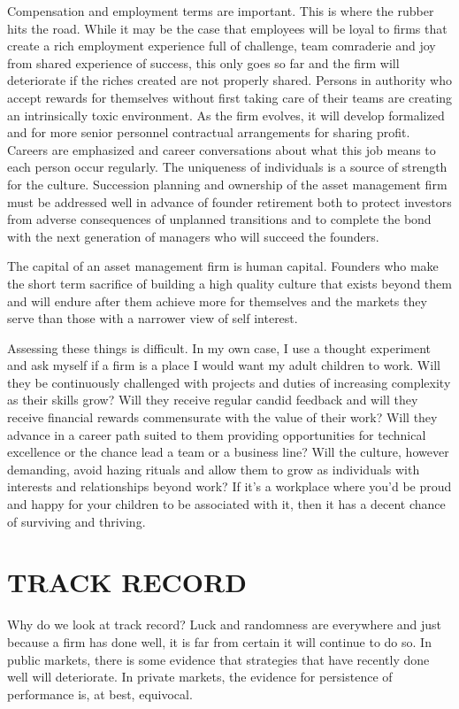 \documentclass[12pt,english]{article}\usepackage[]{graphicx}\usepackage[]{color}
\begin{document}
Compensation and employment terms are important. This is where the
rubber hits the road. While it may be the case that employees will
be loyal to firms that create a rich employment experience full of
challenge, team comraderie and joy from shared experience of success,
this only goes so far and the firm will deteriorate if the riches
created are not properly shared. Persons in authority who accept rewards
for themselves without first taking care of their teams are creating
an intrinsically toxic environment. As the firm evolves, it will develop
formalized and for more senior personnel contractual arrangements
for sharing profit. Careers are emphasized and career conversations
about what this job means to each person occur regularly. The uniqueness
of individuals is a source of strength for the culture. Succession
planning and ownership of the asset management firm must be addressed
well in advance of founder retirement both to protect investors from
adverse consequences of unplanned transitions and to complete the
bond with the next generation of managers who will succeed the founders. 

The capital of an asset management firm is human capital. Founders
who make the short term sacrifice of building a high quality culture
that exists beyond them and will endure after them achieve more for
themselves and the markets they serve than those with a narrower view
of self interest.

Assessing these things is difficult. In my own case, I use a thought
experiment and ask myself if a firm is a place I would want my adult
children to work. Will they be continuously challenged with projects
and duties of increasing complexity as their skills grow? Will they
receive regular candid feedback and will they receive financial rewards
commensurate with the value of their work? Will they advance in a
career path suited to them providing opportunities for technical excellence
or the chance lead a team or a business line? Will the culture, however
demanding, avoid hazing rituals and allow them to grow as individuals
with interests and relationships beyond work? If it's a workplace
where you'd be proud and happy for your children to be associated
with it, then it has a decent chance of surviving and thriving.

\section*{TRACK RECORD}

Why do we look at track record? Luck and randomness are everywhere
and just because a firm has done well, it is far from certain it will
continue to do so. In public markets, there is some evidence that
strategies that have recently done well will deteriorate. In private
markets, the evidence for persistence of performance is, at best,
equivocal.
\end{document}
